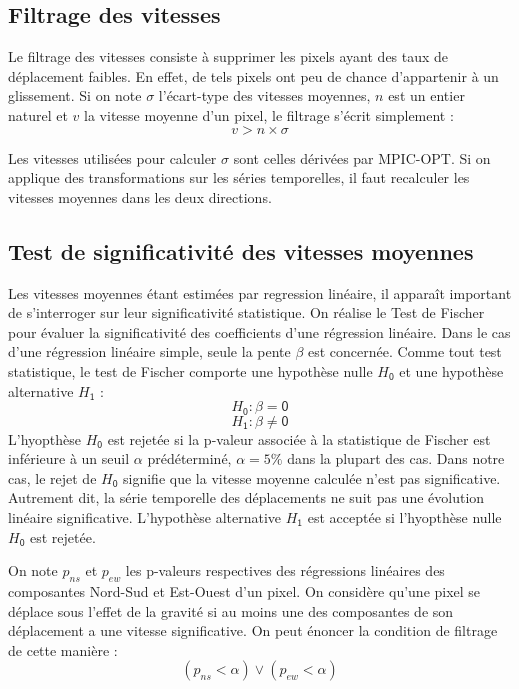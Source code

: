 \documentclass[11pt, openany]{report}
\begin{document}
\subsection{Filtrage des vitesses}
Le filtrage des vitesses consiste à supprimer les pixels ayant des taux de déplacement faibles. En effet, de tels pixels ont peu de chance d'appartenir à un glissement. Si on note $\sigma$ l'écart-type des vitesses moyennes, $n$ est un entier naturel et $v$ la vitesse moyenne d'un pixel, le filtrage s'écrit simplement :
\[  v > n \times \sigma  \]

Les vitesses utilisées pour calculer $\sigma$ sont celles dérivées par MPIC-OPT. Si on applique des transformations sur les séries temporelles, il faut recalculer les vitesses moyennes dans les deux directions.

\subsection{Test de significativité des vitesses moyennes}
Les vitesses moyennes étant estimées par regression linéaire, il apparaît important de s'interroger sur leur significativité statistique. On réalise le Test de Fischer pour évaluer la significativité des coefficients d'une régression linéaire. Dans le cas d'une régression linéaire simple, seule la pente $\beta$ est concernée. Comme tout test statistique, le test de Fischer comporte une hypothèse nulle ${H_{\mathsf{0}}}$ et une hypothèse alternative $H_{\mathsf{1}}$ :
	\[ H_{\mathsf{0}} : \beta =  \mathsf{0} \]
	\[ H_{\mathsf{1}} : \beta \neq \mathsf{0} \]
L'hyopthèse ${H_{\mathsf{0}}}$ est rejetée si la p-valeur associée à la statistique de Fischer est inférieure à un seuil $\alpha$  prédéterminé, $\alpha = 5\%$ dans la plupart des cas. Dans notre cas,  
le rejet de ${H_{\mathsf{0}}}$ signifie que la vitesse moyenne calculée n'est pas significative. Autrement dit, la série temporelle des déplacements ne suit pas une évolution linéaire significative. L'hypothèse alternative ${H_{\mathsf{1}}}$ est acceptée si l'hyopthèse nulle ${H_{\mathsf{0}}}$ est rejetée.

On note $p_{ns}$ et $p_{ew}$ les p-valeurs respectives des régressions linéaires des composantes Nord-Sud et Est-Ouest d'un pixel. On considère qu'une pixel se déplace sous l'effet de la gravité  si au moins une des composantes de son déplacement a une vitesse significative. On peut énoncer la condition de filtrage  de cette manière :
\[ \left(p_{ns} < \alpha \right) \vee \left(p_{ew} < \alpha \right) \]
\end{document}
